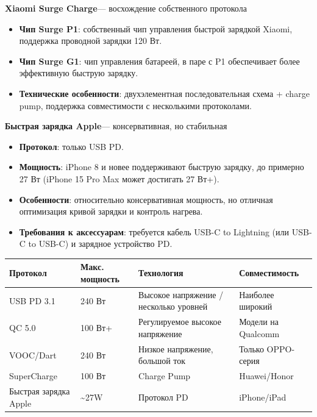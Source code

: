 \textbf{Xiaomi Surge Charge}— восхождение собственного протокола

\begin{itemize}
  \item \textbf{Чип Surge P1}: собственный чип управления быстрой зарядкой Xiaomi, поддержка проводной зарядки 120 Вт.
  \item \textbf{Чип Surge G1}: чип управления батареей, в паре с P1 обеспечивает более эффективную быструю зарядку.
  \item \textbf{Технические особенности}: двухэлементная последовательная схема + charge pump, поддержка совместимости с несколькими протоколами.
\end{itemize}

\textbf{Быстрая зарядка Apple}— консервативная, но стабильная

\begin{itemize}
  \item \textbf{Протокол}: только USB PD.
  \item \textbf{Мощность}: iPhone 8 и новее поддерживают быструю зарядку, до примерно 27 Вт (iPhone 15 Pro Max может достигать 27 Вт+).
  \item \textbf{Особенности}: относительно консервативная мощность, но отличная оптимизация кривой зарядки и контроль нагрева.
  \item \textbf{Требования к аксессуарам}: требуется кабель USB-C to Lightning (или USB-C to USB-C) и зарядное устройство PD.
\end{itemize}


\begin{center}
\begin{tabularx}{\linewidth}{|X|X|X|X|}
\hline
\textbf{Протокол} & \textbf{Макс. мощность} & \textbf{Технология} & \textbf{Совместимость} \tabularnewline
\hline
USB PD 3.1 & 240 Вт & Высокое напряжение / несколько уровней & Наиболее широкий \tabularnewline
QC 5.0 & 100 Вт+ & Регулируемое высокое напряжение & Модели на Qualcomm \tabularnewline
VOOC/Dart & 240 Вт & Низкое напряжение, большой ток & Только OPPO-серия \tabularnewline
SuperCharge & 100 Вт & Charge Pump & Huawei/Honor \tabularnewline
Быстрая зарядка Apple & \textasciitilde{}27W & Протокол PD & iPhone/iPad \tabularnewline
\hline
\end{tabularx}
\end{center}


